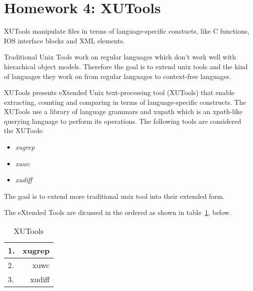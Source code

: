 
\section[Homework 4]{Homework 4: XUTools}

XUTools manipulate files in terms of language-specific constucts, like C functions, IOS interface blocks and XML elements.


Traditional Unix Tools work on regular languages which don't work well with hierachical object models. Therefore the goal is to extend unix tools and the kind of languages they work on from regular languages to context-free languages.


XUTools presents eXtended Unix text-processing tool (XUTools) that enable extracting, counting and comparing in terms of language-specific constructs. The XUTools use a library of language grammars and xupath which is an xpath-like querying language to perform its operations. The following tools are considered the XUTools:

\begin{itemize}
	\item \textit{xugrep}
	\item \textit{xuwc}
	\item \textit{xudiff}
\end{itemize}

The goal is to extend more traditional unix tool into their extended form.

The eXtended Tools are dicussed in the ordered as shown in table~\ref{table:xutools}, below.\\

\begin{table}[h!]
\begin{center}
\begin{tabular}{ l | r }
	\hline
1.&xugrep\\ \hline
2.&xuwc\\ \hline
3.&xudiff\\
	\hline
\end{tabular}
\end{center}
\caption{XUTools}
\label{table:xutools}
\end{table}

\newpage

